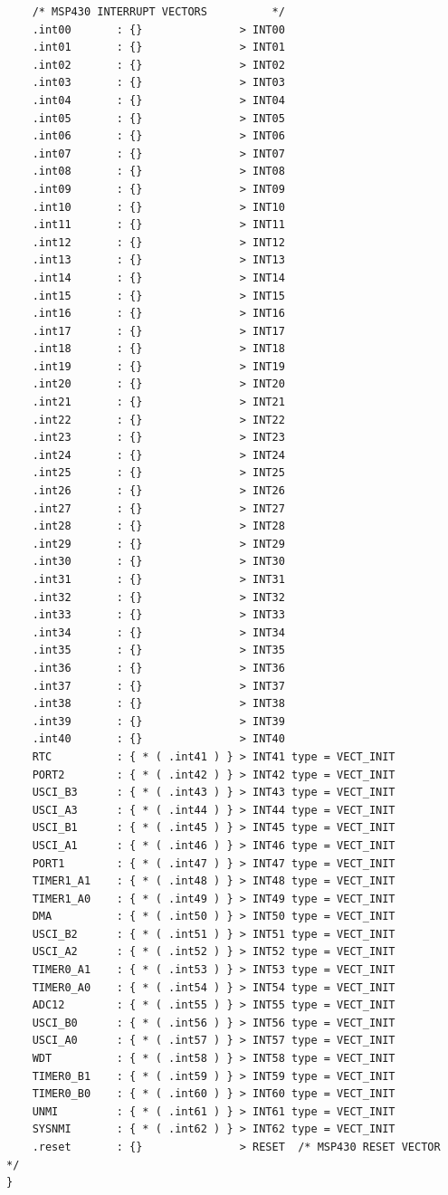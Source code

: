 \documentclass[LaM,binding=0.6cm,oneside]{../sapthesis}
\begin{document}
\begin{lstlisting}
    /* MSP430 INTERRUPT VECTORS          */
    .int00       : {}               > INT00
    .int01       : {}               > INT01
    .int02       : {}               > INT02
    .int03       : {}               > INT03
    .int04       : {}               > INT04
    .int05       : {}               > INT05
    .int06       : {}               > INT06
    .int07       : {}               > INT07
    .int08       : {}               > INT08
    .int09       : {}               > INT09
    .int10       : {}               > INT10
    .int11       : {}               > INT11
    .int12       : {}               > INT12
    .int13       : {}               > INT13
    .int14       : {}               > INT14
    .int15       : {}               > INT15
    .int16       : {}               > INT16
    .int17       : {}               > INT17
    .int18       : {}               > INT18
    .int19       : {}               > INT19
    .int20       : {}               > INT20
    .int21       : {}               > INT21
    .int22       : {}               > INT22
    .int23       : {}               > INT23
    .int24       : {}               > INT24
    .int25       : {}               > INT25
    .int26       : {}               > INT26
    .int27       : {}               > INT27
    .int28       : {}               > INT28
    .int29       : {}               > INT29
    .int30       : {}               > INT30
    .int31       : {}               > INT31
    .int32       : {}               > INT32
    .int33       : {}               > INT33
    .int34       : {}               > INT34
    .int35       : {}               > INT35
    .int36       : {}               > INT36
    .int37       : {}               > INT37
    .int38       : {}               > INT38
    .int39       : {}               > INT39
    .int40       : {}               > INT40
    RTC          : { * ( .int41 ) } > INT41 type = VECT_INIT
    PORT2        : { * ( .int42 ) } > INT42 type = VECT_INIT
    USCI_B3      : { * ( .int43 ) } > INT43 type = VECT_INIT
    USCI_A3      : { * ( .int44 ) } > INT44 type = VECT_INIT
    USCI_B1      : { * ( .int45 ) } > INT45 type = VECT_INIT
    USCI_A1      : { * ( .int46 ) } > INT46 type = VECT_INIT
    PORT1        : { * ( .int47 ) } > INT47 type = VECT_INIT
    TIMER1_A1    : { * ( .int48 ) } > INT48 type = VECT_INIT
    TIMER1_A0    : { * ( .int49 ) } > INT49 type = VECT_INIT
    DMA          : { * ( .int50 ) } > INT50 type = VECT_INIT
    USCI_B2      : { * ( .int51 ) } > INT51 type = VECT_INIT
    USCI_A2      : { * ( .int52 ) } > INT52 type = VECT_INIT
    TIMER0_A1    : { * ( .int53 ) } > INT53 type = VECT_INIT
    TIMER0_A0    : { * ( .int54 ) } > INT54 type = VECT_INIT
    ADC12        : { * ( .int55 ) } > INT55 type = VECT_INIT
    USCI_B0      : { * ( .int56 ) } > INT56 type = VECT_INIT
    USCI_A0      : { * ( .int57 ) } > INT57 type = VECT_INIT
    WDT          : { * ( .int58 ) } > INT58 type = VECT_INIT
    TIMER0_B1    : { * ( .int59 ) } > INT59 type = VECT_INIT
    TIMER0_B0    : { * ( .int60 ) } > INT60 type = VECT_INIT
    UNMI         : { * ( .int61 ) } > INT61 type = VECT_INIT
    SYSNMI       : { * ( .int62 ) } > INT62 type = VECT_INIT
    .reset       : {}               > RESET  /* MSP430 RESET VECTOR         */ 
}


\end{lstlisting}
\end{document}
